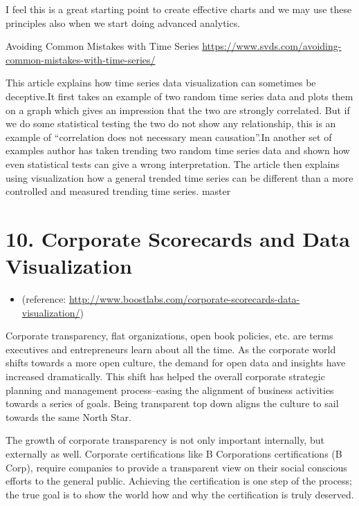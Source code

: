 \documentclass[]{book}
\providecommand{\tightlist}{%
  \setlength{\itemsep}{0pt}\setlength{\parskip}{0pt}}
\theoremstyle{definition}
\theoremstyle{definition}
\theoremstyle{definition}
\theoremstyle{remark}
\begin{document}
I feel this is a great starting point to create effective charts and we
may use these principles also when we start doing advanced analytics.

Avoiding Common Mistakes with Time Series
\url{https://www.svds.com/avoiding-common-mistakes-with-time-series/}

This article explains how time series data visualization can sometimes
be deceptive.It first takes an example of two random time series data
and plots them on a graph which gives an impression that the two are
strongly correlated. But if we do some statistical testing the two do
not show any relationship, this is an example of ``correlation does not
necessary mean causation''.In another set of examples author has taken
trending two random time series data and shown how even statistical
tests can give a wrong interpretation. The article then explains using
visualization how a general trended time series can be different than a
more controlled and measured trending time series. master

\section{10. Corporate Scorecards and Data
Visualization}\label{corporate-scorecards-and-data-visualization}

\begin{itemize}
\tightlist
\item
  (reference:
  \url{http://www.boostlabs.com/corporate-scorecards-data-visualization/})
\end{itemize}

Corporate transparency, flat organizations, open book policies, etc. are
terms executives and entrepreneurs learn about all the time. As the
corporate world shifts towards a more open culture, the demand for open
data and insights have increased dramatically. This shift has helped the
overall corporate strategic planning and management process--easing the
alignment of business activities towards a series of goals. Being
transparent top down aligns the culture to sail towards the same North
Star.

The growth of corporate transparency is not only important internally,
but externally as well. Corporate certifications like B Corporations
certifications (B Corp), require companies to provide a transparent view
on their social conscious efforts to the general public. Achieving the
certification is one step of the process; the true goal is to show the
world how and why the certification is truly deserved.
\end{document}
